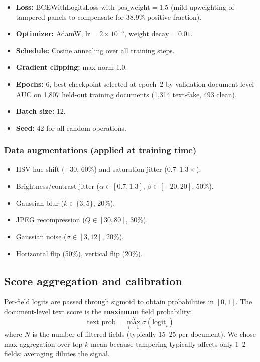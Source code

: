 \documentclass[11pt,a4paper]{article}
\begin{document}
\begin{itemize}[noitemsep]
  \item \textbf{Loss:} BCEWithLogitsLoss with $\text{pos\_weight} = 1.5$
        (mild upweighting of tampered panels to compensate for 38.9\% positive
        fraction).
  \item \textbf{Optimizer:} AdamW, $\text{lr} = 2 \times 10^{-5}$,
        $\text{weight\_decay} = 0.01$.
  \item \textbf{Schedule:} Cosine annealing over all training steps.
  \item \textbf{Gradient clipping:} max norm 1.0.
  \item \textbf{Epochs:} 6, best checkpoint selected at epoch~2 by validation
        document-level AUC on 1{,}807 held-out training documents
        (1{,}314 text-fake, 493 clean).
  \item \textbf{Batch size:} 12.
  \item \textbf{Seed:} 42 for all random operations.
\end{itemize}

\subsubsection{Data augmentations (applied at training time)}

\begin{itemize}[noitemsep]
  \item HSV hue shift ($\pm 30$, 60\%) and saturation jitter ($0.7$--$1.3\times$).
  \item Brightness/contrast jitter ($\alpha \in [0.7, 1.3]$, $\beta \in [-20, 20]$, 50\%).
  \item Gaussian blur ($k \in \{3, 5\}$, 20\%).
  \item JPEG recompression ($Q \in [30, 80]$, 30\%).
  \item Gaussian noise ($\sigma \in [3, 12]$, 20\%).
  \item Horizontal flip (50\%), vertical flip (20\%).
\end{itemize}

\subsection{Score aggregation and calibration}

Per-field logits are passed through sigmoid to obtain probabilities in $[0, 1]$.
The document-level text score is the \textbf{maximum} field probability:
\[
  \text{text\_prob} = \max_{i=1}^{N} \sigma(\text{logit}_i)
\]
where $N$ is the number of filtered fields (typically 15--25 per document).
We chose max aggregation over top-$k$ mean because tampering typically affects
only 1--2 fields; averaging dilutes the signal.
\end{document}
